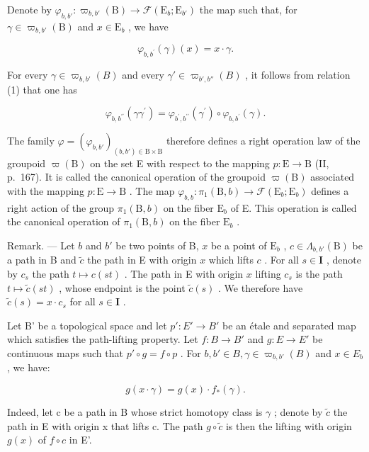 Denote by \(\varphi_{b,b'}\colon \varpi_{b,b'}(\mathrm{B})\to \mathcal{F}(\mathrm{E}_b;\mathrm{E}_{b'})\) the map such that, for \(\gamma \in \varpi_{b,b'}(\mathrm{B})\) and \(x\in \mathrm{E}_b\) , we have

\[
\varphi_ {b, b ^ {\prime}} (\gamma) (x) = x \cdot \gamma .
\]

For every \(\gamma \in \varpi_{b,b'}(B)\) and every \(\gamma' \in \varpi_{b',b''}(B)\) , it follows from relation (1) that one has

\[
\varphi_ {b, b ^ {\prime \prime}} (\gamma \gamma^ {\prime}) = \varphi_ {b ^ {\prime}, b ^ {\prime \prime}} (\gamma^ {\prime}) \circ \varphi_ {b, b ^ {\prime}} (\gamma).\tag{2}
\]

The family \(\varphi = (\varphi_{b,b'})_{(b,b')\in\mathrm{B}\times\mathrm{B}}\) therefore defines a right operation law of the groupoid \(\varpi(\mathrm{B})\) on the set E with respect to the mapping \(p\colon\mathrm{E}\to\mathrm{B}\) (II, p.~167). It is called the canonical operation of the groupoid \(\varpi(\mathrm{B})\) associated with the mapping \(p\colon\mathrm{E}\to\mathrm{B}\) . The map \(\varphi_{b,b}\colon\pi_{1}(\mathrm{B},b)\to\mathcal{F}(\mathrm{E}_{b};\mathrm{E}_{b})\) defines a right action of the group \(\pi_{1}(\mathrm{B},b)\) on the fiber \(\mathrm{E}_{b}\) of E. This operation is called the canonical operation of \(\pi_{1}(\mathrm{B},b)\) on the fiber \(\mathrm{E}_{b}\) .

Remark. --- Let \(b\) and \(b'\) be two points of B, \(x\) be a point of \(\mathrm{E}_b\) , \(c \in \Lambda_{b,b'}(\mathrm{B})\) be a path in B and \(\widetilde{c}\) the path in E with origin \(x\) which lifts \(c\) . For all \(s \in \mathbf{I}\) , denote by \(c_s\) the path \(t \mapsto c(st)\) . The path in E with origin \(x\) lifting \(c_s\) is the path \(t \mapsto \widetilde{c}(st)\) , whose endpoint is the point \(\widetilde{c}(s)\) . We therefore have \(\widetilde{c}(s) = x \cdot c_s\) for all \(s \in \mathbf{I}\) .

Let B' be a topological space and let \(p'\colon E'\to B'\) be an étale and separated map which satisfies the path-lifting property. Let \(f\colon B\to B'\) and \(g\colon E\to E'\) be continuous maps such that \(p'\circ g=f\circ p\) . For \(b, b'\in B, \gamma\in\varpi_{b,b'}(B)\) and \(x\in E_b\) , we have:

\[
g (x \cdot \gamma) = g (x) \cdot f _ {*} (\gamma).\tag{3}
\]

Indeed, let c be a path in B whose strict homotopy class is \(\gamma\) ; denote by \(\widetilde{c}\) the path in E with origin x that lifts c. The path \(g \circ \widetilde{c}\) is then the lifting with origin \(g(x)\) of \(f \circ c\) in E'.

